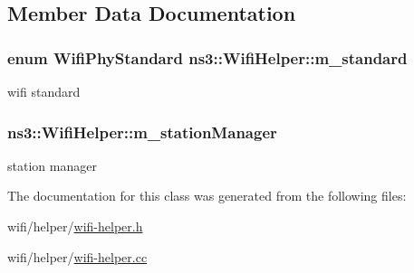 \subsection{Member Data Documentation}
\subsubsection[{\texorpdfstring{m\+\_\+standard}{m_standard}}]{\setlength{\rightskip}{0pt plus 5cm}enum {\bf Wifi\+Phy\+Standard} ns3\+::\+Wifi\+Helper\+::m\+\_\+standard\hspace{0.3cm}{\ttfamily [protected]}}\hypertarget{classns3_1_1WifiHelper_a7332cde0fc9be5f60674f116d14dcc00}{}\label{classns3_1_1WifiHelper_a7332cde0fc9be5f60674f116d14dcc00}


wifi standard 

\subsubsection[{\texorpdfstring{m\+\_\+station\+Manager}{m_stationManager}}]{ ns3\+::\+Wifi\+Helper\+::m\+\_\+station\+Manager\hspace{0.3cm}{\ttfamily [protected]}}\hypertarget{classns3_1_1WifiHelper_a80414b0404c4a2dce20180fb30d489f4}{}\label{classns3_1_1WifiHelper_a80414b0404c4a2dce20180fb30d489f4}


station manager 



The documentation for this class was generated from the following files\+:\begin{DoxyCompactItemize}
\item 
wifi/helper/\hyperlink{wifi-helper_8h}{wifi-\/helper.\+h}\item 
wifi/helper/\hyperlink{wifi-helper_8cc}{wifi-\/helper.\+cc}\end{DoxyCompactItemize}

